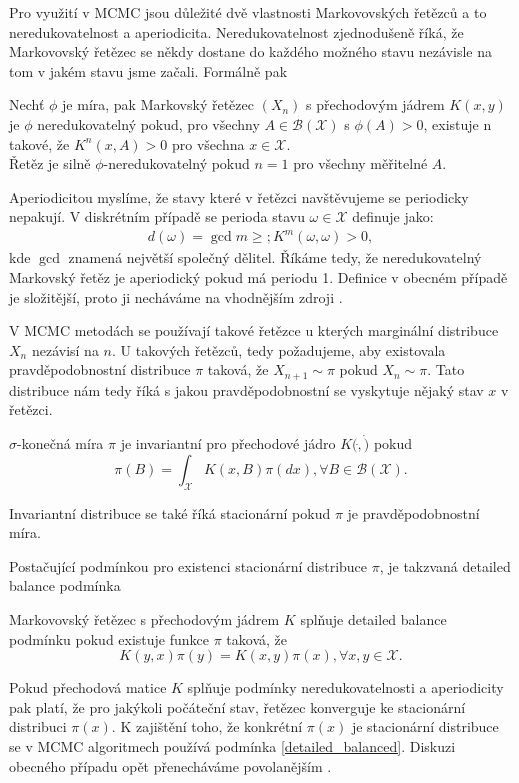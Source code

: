\documentclass[czech,master,public,dept470,male,cpdeclaration,oneside, python]{diploma}
\begin{document}
Pro využití v MCMC jsou důležité dvě vlastnosti Markovovských řetězců a to neredukovatelnost a aperiodicita. Neredukovatelnost zjednodušeně říká, že Markovovský řetězec se někdy dostane do každého možného stavu nezávisle na tom v jakém stavu jsme začali. Formálně pak 
\begin{definition}
	Nechť $\phi$ je míra, pak Markovský řetězec $(X_n)$ s přechodovým jádrem $K(x,y)$ je $\phi$ 
	neredukovatelný pokud, pro všechny $A \in \mathcal{B}(\mathcal{X})$ s $\phi(A) > 0$, existuje n takové, že $K^n(x, A) > 0$ pro všechna $x \in \mathcal{X}$. \\
	Řetěz je silně $\phi$-neredukovatelný pokud $n=1$ pro všechny měřitelné $A$.
\end{definition}

Aperiodicitou myslíme, že stavy které v řetězci navštěvujeme se periodicky nepakují. V diskrétním případě se perioda stavu $\omega \in \mathcal{X}$ definuje jako:
\begin{align}
	d(\omega) = \gcd {m \geq; K^m(\omega, \omega) > 0},
\end{align}
kde $\gcd$ znamená největší společný dělitel. Říkáme tedy, že neredukovatelný Markovský řetěz je aperiodický pokud má periodu 1. Definice v obecném případě je složitější, proto ji necháváme na vhodnějším zdroji \cite{robert2004monte}. \par

V MCMC metodách se používají takové řetězce u kterých marginální distribuce $X_n$ nezávisí na $n$. U takových řetězců, tedy požadujeme, aby existovala pravděpodobnostní distribuce $\pi$ taková, že $X_{n+1} \sim \pi$ pokud $X_n \sim \pi$. Tato distribuce nám tedy říká s jakou pravděpodobnostní se vyskytuje nějaký stav $x$ v řetězci. 

\begin{definition}
	$\sigma$-konečná míra $\pi$ je invariantní pro přechodové jádro $K(\dot, \dot)$ pokud
	\begin{equation*}
		\pi(B) = \int_{\mathcal{X}} K(x, B)\pi(dx), \forall B \in \mathcal{B}(\mathcal{X}).
	\end{equation*}
\end{definition}
Invariantní distribuce se také říká stacionární pokud $\pi$ je pravděpodobnostní míra. \par 
Postačující podmínkou pro existenci stacionární distribuce $\pi$, je takzvaná detailed balance podmínka
\begin{definition}\label{detailed_balanced}
	Markovovský řetězec s přechodovým jádrem $K$ splňuje detailed balance podmínku pokud existuje funkce $\pi$ taková, že
	\begin{equation*}
		K(y, x)\pi(y) = K(x, y)\pi(x), \forall x,y \in \mathcal{X}.
	\end{equation*}
\end{definition}
Pokud přechodová matice $K$ splňuje podmínky neredukovatelnosti a aperiodicity pak platí, že pro jakýkoli počáteční stav, řetězec konverguje ke stacionární distribuci $\pi(x)$. K zajištění toho, že konkrétní $\pi(x)$ je stacionární distribuce se v MCMC algoritmech používá podmínka \ref{detailed_balanced}. Diskuzi obecného případu opět přenecháváme povolanějším \cite{robert2004monte}.
\end{document}
